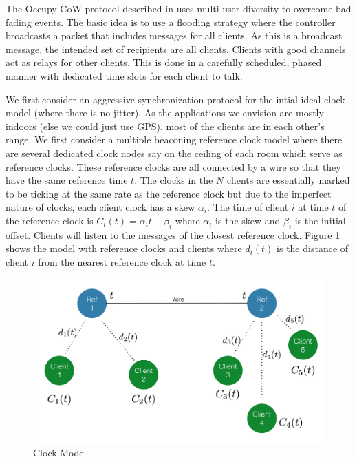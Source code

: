\documentclass[10pt, journal, letter, onecolumn]{IEEEtran}
\begin{document}
The Occupy CoW protocol described in \cite{swamy2015cooperative} uses multi-user diversity to overcome bad fading events. The basic idea is to use a flooding strategy where the controller broadcasts a packet that includes messages for all clients. As this is a broadcast message, the intended set of recipients are all clients. Clients with good channels act as relays for other clients. This is done in a carefully scheduled, phased manner with dedicated time slots for each client to talk.

We first consider an aggressive synchronization protocol for the intial ideal clock model (where there is no jitter). As the applications we envision are mostly indoors (else we could just use GPS), most of the clients are in each other's range. We first consider a multiple beaconing reference clock model where there are several dedicated clock nodes say on the ceiling of each room which serve as reference clocks. These reference clocks are all connected by a wire so that they have the same reference time $t$.
The clocks in the $N$ clients are essentially marked to be ticking at the same rate as the reference clock but due to the imperfect nature of clocks, each client clock has a skew $\alpha_i$.
The time of client $i$ at time $t$ of the reference clock is $C_i(t) = \alpha_ i t + \beta_i$ where $\alpha_i$ is the skew and $\beta_i$ is the initial offset. Clients will listen to the messages of the closest reference clock. Figure \ref{fig:clock_model} shows the model with reference clocks and clients where $d_i(t)$ is the distance of client $i$ from the nearest reference clock at time $t$.

\begin{figure}[h]
    \centering
    \includegraphics[scale=0.4]{figures/figure1}
    \caption{Clock Model}
    \label{fig:clock_model}
\end{figure}
\end{document}
